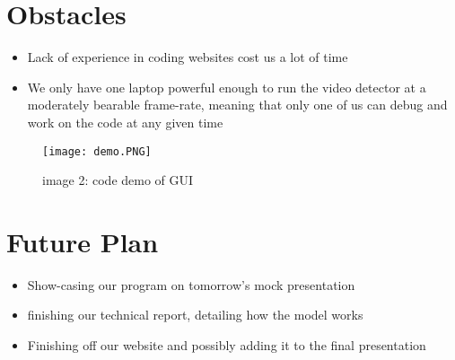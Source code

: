 \documentclass{article}
\begin{document}
\section{Obstacles}
\begin{itemize}
	\item{Lack of experience in coding websites cost us a lot of time}
	\item{We only have one laptop powerful enough to run the video detector at a moderately bearable frame-rate, meaning that only one of us can debug and work on the code at any given time}
\end{itemize}

\begin{figure}[h!]
	\centering
	\texttt{[image: demo.PNG]}
	\caption*{image 2: code demo of GUI}
\end{figure}


\section{Future Plan}
\begin{itemize}
	\item Show-casing our program on tomorrow's mock presentation
	\item finishing our technical report, detailing how the model works
	\item Finishing off our website and possibly adding it to the final presentation
\end{itemize}
\end{document}
